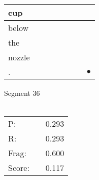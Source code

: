 \documentclass[landscape]{article}
\newcommand{\ssp}{\hspace{2pt}}
\newcommand{\mex}{\cellcolor{g}$\bullet$}
\begin{document}
\begin{tabular}{|l|p{10pt}|p{10pt}|p{10pt}|p{10pt}|p{10pt}|p{10pt}|p{10pt}|}
\hline
\ssp cup \ssp&\hspace{2pt}&\hspace{2pt}&\hspace{2pt}&\hspace{2pt}&\hspace{2pt}&\hspace{2pt}&\hspace{2pt}\\
\hline
\ssp below \ssp&\hspace{2pt}&\hspace{2pt}&\hspace{2pt}&\hspace{2pt}&\hspace{2pt}&\hspace{2pt}&\hspace{2pt}\\
\hline
\ssp the \ssp&\hspace{2pt}&\hspace{2pt}&\hspace{2pt}&\hspace{2pt}&\hspace{2pt}&\hspace{2pt}&\hspace{2pt}\\
\hline
\ssp nozzle \ssp&\hspace{2pt}&\hspace{2pt}&\hspace{2pt}&\hspace{2pt}&\hspace{2pt}&\hspace{2pt}&\hspace{2pt}\\
\hline
\ssp \cellcolor{ref6}. \ssp&\hspace{2pt}&\hspace{2pt}&\hspace{2pt}&\hspace{2pt}&\hspace{2pt}&\hspace{2pt}&\hspace{2pt}\mex\\
\hline
\end{tabular}

\vspace{6pt}
\noindent Segment 36\\\\
\noindent\begin{tabular}{lm{12pt}r}
\hline
P:&&0.293\\
R:&&0.293\\
Frag:&&0.600\\
Score:&&0.117\\
\end{tabular}
\end{document}
